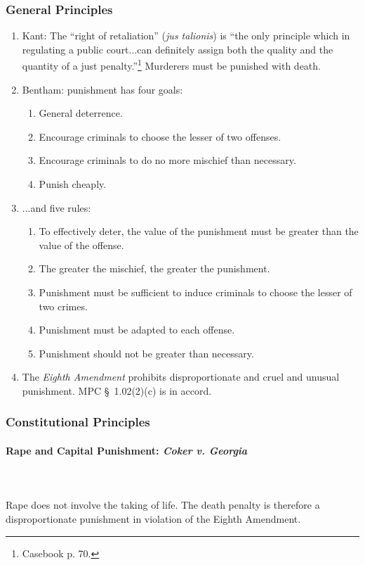 \subsubsection{General Principles}

\begin{enumerate}
    \item Kant: The ``right of retaliation'' (\emph{jus talionis}) is ``the 
    only principle which in regulating a public court...can definitely assign 
    both the quality and the quantity of a just penalty.''\footnote{Casebook 
    p. 70.} Murderers must be punished with death.
    \item Bentham: punishment has four goals:
    \begin{enumerate}
        \item General deterrence.
        \item Encourage criminals to choose the lesser of two offenses.
        \item Encourage criminals to do no more mischief than necessary.
        \item Punish cheaply.
    \end{enumerate}
    \item ...and five rules:
    \begin{enumerate}
        \item To effectively deter, the value of the punishment must be 
        greater than the value of the offense.
        \item The greater the mischief, the greater the punishment.
        \item Punishment must be sufficient to induce criminals to choose the 
        lesser of two crimes.
        \item Punishment must be adapted to each offense.
        \item Punishment should not be greater than necessary.
    \end{enumerate}
    \item The \emph{Eighth Amendment} prohibits disproportionate and cruel and 
    unusual punishment. MPC \S\ 1.02(2)(c) is in accord.
\end{enumerate}

\subsubsection{Constitutional Principles}

\paragraph{Rape and Capital Punishment: \emph{Coker v. Georgia}}
~\\\\
Rape does not involve the taking of life. The death penalty is therefore a 
disproportionate punishment in violation of the Eighth Amendment.


